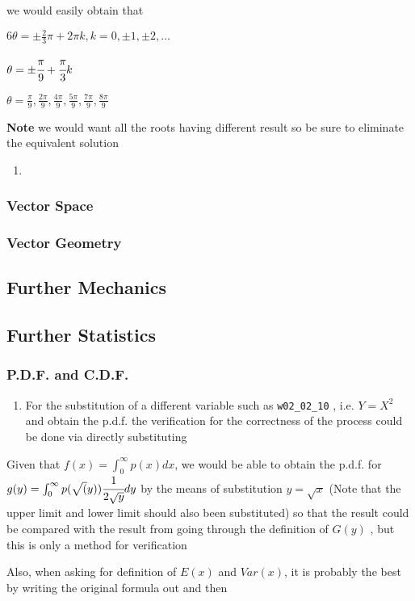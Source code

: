 \documentclass[]{article}
\begin{document}
we would easily obtain that

\(6\theta = \pm \frac{2}{3} \pi + 2\pi k, k = 0, \pm1, \pm 2,\dots\)

\(\theta = \pm \cfrac{\pi}{9} + \cfrac{\pi}{3}k\)

\(\theta = \frac{\pi}{9},\frac{2\pi}{9},\frac{4\pi}{9},\frac{5\pi}{9},\frac{7\pi}{9},\frac{8\pi}{9}\)

\textbf{Note} we would want all the roots having different result so be
sure to eliminate the equivalent solution

\begin{enumerate}
\def\labelenumi{\arabic{enumi}.}
\item
\end{enumerate}

\subsubsection{Vector Space}\label{header-n145}

\subsubsection{Vector Geometry}\label{header-n186}

\subsection{Further Mechanics}\label{header-n147}

\subsection{Further Statistics}\label{header-n149}

\subsubsection{P.D.F. and C.D.F.}\label{header-n150}

\begin{enumerate}
\def\labelenumi{\arabic{enumi}.}
\item
  For the substitution of a different variable such as
  \texttt{w02\_02\_10} , i.e. \(Y = X^2\) and obtain the p.d.f. the
  verification for the correctness of the process could be done via
  directly substituting
\end{enumerate}

Given that \(f(x) = \int^\infty_0 p(x) dx\), we would be able to obtain
the p.d.f. for
\(g(y) = \int_0^\infty p(\sqrt(y)) \cfrac{1}{2\sqrt{y}} dy\) by the
means of substitution \(y  = \sqrt{x}\) (Note that the upper limit and
lower limit should also been substituted) so that the result could be
compared with the result from going through the definition of \(G(y)\) ,
but this is only a method for verification

Also, when asking for definition of \(E(x)\) and \(Var(x)\), it is
probably the best by writing the original formula out and then
\end{document}

